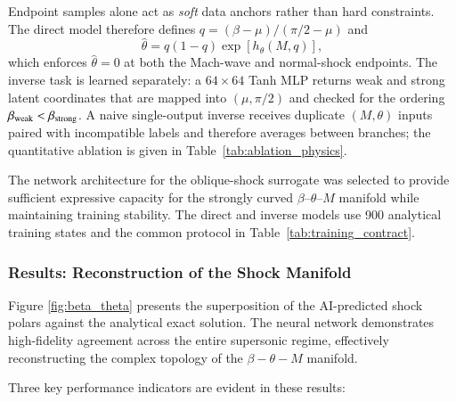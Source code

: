 \documentclass[preprint,12pt]{elsarticle}
\newcommand{\rev}[1]{#1}
\newenvironment{revision}{}{}
\newcommand{\rev}[1]{\textcolor{revisionblue}{#1}}
\newenvironment{revision}{\color{revisionblue}}{}
\begin{document}
\begin{revision}
Endpoint samples alone act as \emph{soft} data anchors rather than hard constraints. The direct model therefore defines $q=(\beta-\mu)/(\pi/2-\mu)$ and
\begin{equation}
\widehat{\theta}=q(1-q)\exp[h_\theta(M,q)],
\label{eq:oblique_envelope}
\end{equation}
which enforces $\widehat{\theta}=0$ at both the Mach-wave and normal-shock endpoints. The inverse task is learned separately: a $64\times64$ Tanh MLP returns weak and strong latent coordinates that are mapped into $(\mu,\pi/2)$ and checked for the ordering $\beta_{\rm weak}<\beta_{\rm strong}$. A naive single-output inverse receives duplicate $(M,\theta)$ inputs paired with incompatible labels and therefore averages between branches; the quantitative ablation is given in Table~\ref{tab:ablation_physics}.
\end{revision}



The network architecture for the oblique-shock surrogate was selected to provide sufficient expressive capacity for the strongly curved $\beta$--$\theta$--$M$ manifold while maintaining training stability. \rev{The direct and inverse models use 900 analytical training states and the common protocol in Table~\ref{tab:training_contract}.}

\subsubsection{Results: Reconstruction of the Shock Manifold}

Figure \ref{fig:beta_theta} presents the superposition of the AI-predicted shock polars against the analytical exact solution. The neural network demonstrates high-fidelity agreement across the entire supersonic regime, effectively reconstructing the complex topology of the $\beta-\theta-M$ manifold.

Three key performance indicators are evident in these results:
\end{document}
